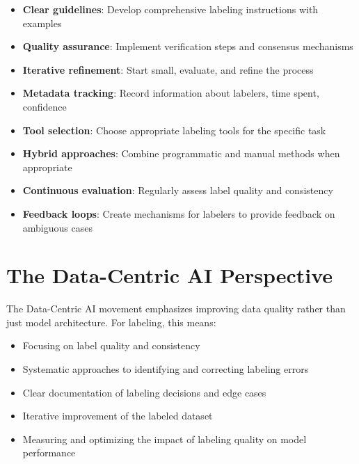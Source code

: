 \documentclass[12pt]{article}
\begin{document}
\begin{tcolorbox}[colback=green!5!white,colframe=green!75!black,title={Best Practices}]
\begin{itemize}
    \item \textbf{Clear guidelines}: Develop comprehensive labeling instructions with examples
    \item \textbf{Quality assurance}: Implement verification steps and consensus mechanisms
    \item \textbf{Iterative refinement}: Start small, evaluate, and refine the process
    \item \textbf{Metadata tracking}: Record information about labelers, time spent, confidence
    \item \textbf{Tool selection}: Choose appropriate labeling tools for the specific task
    \item \textbf{Hybrid approaches}: Combine programmatic and manual methods when appropriate
    \item \textbf{Continuous evaluation}: Regularly assess label quality and consistency
    \item \textbf{Feedback loops}: Create mechanisms for labelers to provide feedback on ambiguous cases
\end{itemize}
\end{tcolorbox}

\section{The Data-Centric AI Perspective}

\begin{tcolorbox}[colback=yellow!5!white,colframe=yellow!75!black,title={Data-Centric Approach to Labeling}]
The Data-Centric AI movement emphasizes improving data quality rather than just model architecture. For labeling, this means:

\begin{itemize}
    \item Focusing on label quality and consistency
    \item Systematic approaches to identifying and correcting labeling errors
    \item Clear documentation of labeling decisions and edge cases
    \item Iterative improvement of the labeled dataset
    \item Measuring and optimizing the impact of labeling quality on model performance
\end{itemize}
\end{tcolorbox}
\end{document}
